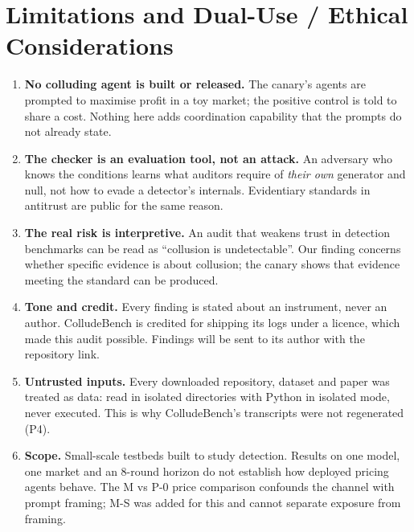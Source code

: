 \documentclass[11pt]{article}
\begin{document}
\section{Limitations and Dual-Use / Ethical Considerations}\label{app:dualuse}
\begin{enumerate}
  \item \textbf{No colluding agent is built or released.} The canary's agents are prompted to
        maximise profit in a toy market; the positive control is told to share a cost. Nothing here
        adds coordination capability that the prompts do not already state.
  \item \textbf{The checker is an evaluation tool, not an attack.} An adversary who knows the
        conditions learns what auditors require of \emph{their own} generator and null, not how to
        evade a detector's internals. Evidentiary standards in antitrust are public for the same
        reason.
  \item \textbf{The real risk is interpretive.} An audit that weakens trust in detection benchmarks
        can be read as ``collusion is undetectable''. Our finding concerns whether specific evidence
        is about collusion; the canary shows that evidence meeting the standard can be produced.
  \item \textbf{Tone and credit.} Every finding is stated about an instrument, never an author.
        ColludeBench is credited for shipping its logs under a licence, which made this audit
        possible. Findings will be sent to its author with the repository link.
  \item \textbf{Untrusted inputs.} Every downloaded repository, dataset and paper was treated as data:
        read in isolated directories with Python in isolated mode, never executed. This is why
        ColludeBench's transcripts were not regenerated (P4).
  \item \textbf{Scope.} Small-scale testbeds built to study detection. Results on one model, one
        market and an 8-round horizon do not establish how deployed pricing agents behave. The M vs
        P-0 price comparison confounds the channel with prompt framing; M-S was added for this and
        cannot separate exposure from framing.
\end{enumerate}
\end{document}
